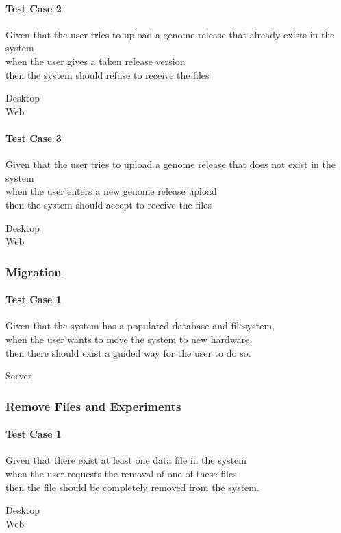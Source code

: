 \paragraph*{Test Case 2}
Given that the user tries to upload a genome release that already exists in the system \\ when the user gives a taken release version \\ then the system should refuse to receive the files
\begin{description}
 \item[Desktop] \xmark 
 \item[Web] \xmark
\end{description}
\paragraph*{Test Case 3}
Given that the user tries to upload a genome release that does not exist in the system \\ when the user enters a new genome release upload \\ then the system should accept to receive the files
\begin{description}
 \item[Desktop] \cmark
 \item[Web] \cmark
\end{description}


\subsubsection{Migration}
\paragraph*{Test Case 1}
Given that the system has a populated database and filesystem, \\ when the user wants to move the system to new hardware, \\ then there should exist a guided way for the user to do so.
\begin{description}
 \item[Server]
\end{description}


\subsubsection{Remove Files and Experiments}
\paragraph*{Test Case 1}
Given that there exist at least one data file in the system \\ when the user requests the removal of one of these files \\ then the file should be completely removed from the system.
\begin{description}
 \item[Desktop]
 \item[Web]
\end{description}
